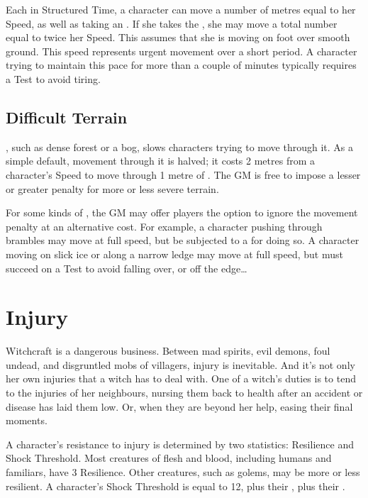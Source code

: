 Each {\turn} in Structured Time, a character can move a number of metres equal to her Speed, as well as taking an {\action}.
If she takes the  {\action}, she may move a total number equal to twice her Speed.
This assumes that she is moving on foot over smooth ground.
This speed represents urgent movement over a short period.
A character trying to maintain this pace for more than a couple of minutes typically requires a  Test to avoid tiring.



\subsection{Difficult Terrain}

{\diffterrain}, such as dense forest or a bog, slows characters trying to move through it.
As a simple default, movement through it is halved; it costs 2 metres from a character's Speed to move through 1 metre of {\diffterrain}.
The GM is free to impose a lesser or greater penalty for more or less severe terrain.

For some kinds of {\diffterrain}, the GM may offer players the option to ignore the movement penalty at an alternative cost.
For example, a character pushing through brambles may move at full speed, but be subjected to a  for doing so.
A character moving on slick ice or along a narrow ledge may move at full speed, but must succeed on a  Test to avoid falling over, or off the edge{\dots}

\section{Injury}

Witchcraft is a dangerous business.
Between mad spirits, evil demons, foul undead, and disgruntled mobs of villagers, injury is inevitable.
And it's not only her own injuries that a witch has to deal with.
One of a witch's duties is to tend to the injuries of her neighbours, nursing them back to health after an accident or disease has laid them low.
Or, when they are beyond her help, easing their final moments.

A character's resistance to injury is determined by two statistics: Resilience and Shock Threshold.
Most creatures of flesh and blood, including humans and familiars, have $3$ Resilience.
Other creatures, such as golems, may be more or less resilient.
A character's Shock Threshold is equal to 12, plus their , plus their .

